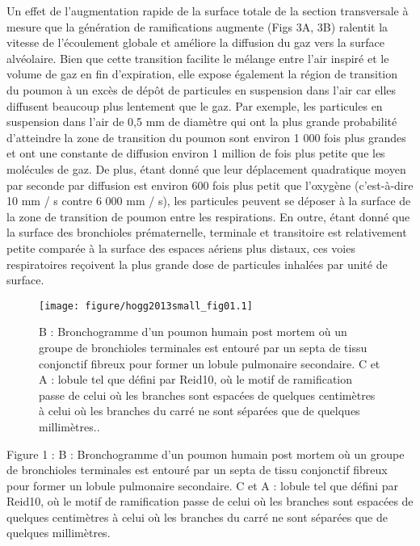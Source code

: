 \documentclass[12pt,]{article}
\begin{document}
Un effet de l'augmentation rapide de la surface totale de la section
transversale à mesure que la génération de ramifications augmente (Figs
3A, 3B) ralentit la vitesse de l'écoulement globale et améliore la
diffusion du gaz vers la surface alvéolaire. Bien que cette transition
facilite le mélange entre l'air inspiré et le volume de gaz en fin
d'expiration, elle expose également la région de transition du poumon à
un excès de dépôt de particules en suspension dans l'air car elles
diffusent beaucoup plus lentement que le gaz. Par exemple, les
particules en suspension dans l'air de 0,5 mm de diamètre qui ont la
plus grande probabilité d'atteindre la zone de transition du poumon sont
environ 1 000 fois plus grandes et ont une constante de diffusion
environ 1 million de fois plus petite que les molécules de gaz. De plus,
étant donné que leur déplacement quadratique moyen par seconde par
diffusion est environ 600 fois plus petit que l'oxygène (c'est-à-dire 10
mm / s contre 6 000 mm / s), les particules peuvent se déposer à la
surface de la zone de transition de poumon entre les respirations. En
outre, étant donné que la surface des bronchioles prématernelle,
terminale et transitoire est relativement petite comparée à la surface
des espaces aériens plus distaux, ces voies respiratoires reçoivent la
plus grande dose de particules inhalées par unité de surface.

\begin{figure}[h!]

{\centering \texttt{[image: figure/hogg2013small\_fig01.1]} 

}

\caption{B : Bronchogramme d'un poumon humain post mortem où un groupe de bronchioles terminales est entouré par un septa de tissu conjonctif fibreux pour former un lobule pulmonaire secondaire. C et A : lobule tel que défini par Reid10, où le motif de ramification passe de celui où les branches sont espacées de quelques centimètres à celui où les branches du carré ne sont séparées que de quelques millimètres..}\label{fig:unnamed-chunk-2}
\end{figure}

Figure 1 : B : Bronchogramme d'un poumon humain post mortem où un groupe
de bronchioles terminales est entouré par un septa de tissu conjonctif
fibreux pour former un lobule pulmonaire secondaire. C et A : lobule tel
que défini par Reid10, où le motif de ramification passe de celui où les
branches sont espacées de quelques centimètres à celui où les branches
du carré ne sont séparées que de quelques millimètres.
\end{document}
